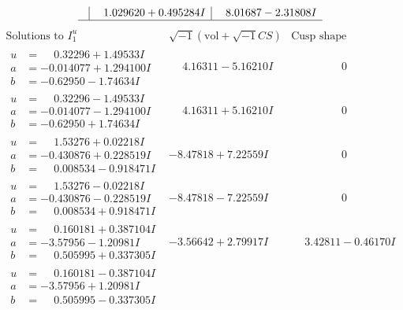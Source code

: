 \documentclass[1p]{elsarticle_modified}
\theoremstyle{definition}
\newcommand{\I}{\sqrt{-1}}
\begin{document}
$$\begin{array}{c|c|c}
 & \phantom{-}1.029620 + 0.495284 I & \phantom{-}8.01687 - 2.31808 I\\
 \hline 
 \end{array}$$\newpage$$\begin{array}{c|c|c}  
\text{Solutions to }I^u_{1}& \I (\text{vol} + \sqrt{-1}CS) & \text{Cusp shape}\\
 \hline 
\begin{aligned}
u &= \phantom{-}0.32296 + 1.49533 I \\
a &= -0.014077 + 1.294100 I \\
b &= -0.62950 - 1.74634 I\end{aligned}
 & \phantom{-}4.16311 - 5.16210 I & \phantom{-0.000000 } 0 \\ \hline\begin{aligned}
u &= \phantom{-}0.32296 - 1.49533 I \\
a &= -0.014077 - 1.294100 I \\
b &= -0.62950 + 1.74634 I\end{aligned}
 & \phantom{-}4.16311 + 5.16210 I & \phantom{-0.000000 } 0 \\ \hline\begin{aligned}
u &= \phantom{-}1.53276 + 0.02218 I \\
a &= -0.430876 + 0.228519 I \\
b &= \phantom{-}0.008534 - 0.918471 I\end{aligned}
 & -8.47818 + 7.22559 I & \phantom{-0.000000 } 0 \\ \hline\begin{aligned}
u &= \phantom{-}1.53276 - 0.02218 I \\
a &= -0.430876 - 0.228519 I \\
b &= \phantom{-}0.008534 + 0.918471 I\end{aligned}
 & -8.47818 - 7.22559 I & \phantom{-0.000000 } 0 \\ \hline\begin{aligned}
u &= \phantom{-}0.160181 + 0.387104 I \\
a &= -3.57956 - 1.20981 I \\
b &= \phantom{-}0.505995 + 0.337305 I\end{aligned}
 & -3.56642 + 2.79917 I & \phantom{-}3.42811 - 0.46170 I \\ \hline\begin{aligned}
u &= \phantom{-}0.160181 - 0.387104 I \\
a &= -3.57956 + 1.20981 I \\
b &= \phantom{-}0.505995 - 0.337305 I\end{aligned}

\end{array}$$
\end{document}
